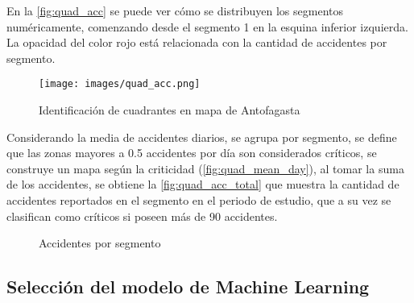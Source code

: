 \documentclass[12pt]{article}
\begin{document}
En la \autoref{fig:quad_acc} se puede ver cómo se distribuyen los segmentos numéricamente, comenzando desde el segmento 1 en la esquina inferior izquierda. La opacidad del color rojo está relacionada con la cantidad de accidentes por segmento.

\begin{figure}[H]
    \centering
    \texttt{[image: images/quad\_acc.png]}
    \caption{Identificación de cuadrantes en mapa de Antofagasta}
    \label{fig:quad_acc}
\end{figure}

Considerando la media de accidentes diarios, se agrupa por segmento, se define que las zonas mayores a 0.5 accidentes por día son considerados críticos, se construye un mapa según la criticidad (\autoref{fig:quad_mean_day}), al tomar la suma de los accidentes, se obtiene la \autoref{fig:quad_acc_total} que muestra la cantidad de accidentes reportados en el segmento en el periodo de estudio, que a su vez se clasifican como críticos si poseen más de 90 accidentes.

\begin{figure}[H]
    \centering
    \caption{Accidentes por segmento}
\end{figure}

\subsection{Selección del modelo de Machine Learning}
\end{document}
